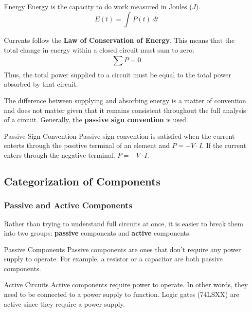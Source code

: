 \documentclass[12pt]{article}
\begin{document}
\begin{definition}{Energy}
  Energy is the capacity to do work measured in Joules ($J$).
  \begin{equation*}
    E(t) = \int_{}^{} P(t) \, dt
  \end{equation*}
\end{definition}

Currents follow the \textbf{Law of Conservation of Energy}. This means that the total change in energy within a closed circuit must sum to zero:
\begin{equation*}
  \sum_{}^{} P = 0
\end{equation*}
Thus, the total power supplied to a circuit must be equal to the total power absorbed by that circuit.

The difference between supplying and absorbing energy is a matter of convention and does not matter given that it remains consistent throughout the full analysis of a circuit. Generally, the \textbf{passive sign convention} is used.

\begin{definition}{Passive Sign Convention}
  Passive sign convention is satisfied when the current enterts through the positive terminal of an element and $P=+V \cdot I$. If the current enters through the negative terminal, $P = -V \cdot I$.
\end{definition}

\subsection{Categorization of Components}
\label{ssec:categorizationOfComponents}

\subsubsection{Passive and Active Components}
\label{sssec:passiveAndActiveComponents}

Rather than trying to understand full circuits at once, it is easier to break them into two groups: \textbf{passive} components and \textbf{active} components.

\begin{definition}{Passive Components}
  Passive components are ones that don't require any power supply to operate. For example, a resistor or a capacitor are both passive components.
\end{definition}

\begin{definition}{Active Circuits}
  Active components require power to operate. In other words, they need to be connected to a power supply to function. Logic gates (74LSXX) are active since they require a power supply.
\end{definition}
\end{document}

